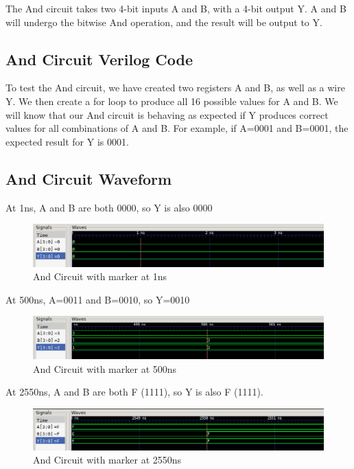 \documentclass[12pt]{article}
\begin{document}
The And circuit takes two 4-bit inputs A and B, with a 4-bit output Y. A and B will undergo the bitwise And operation, and the result will be output to Y.

\subsection{And Circuit Verilog Code} 
 

To test the And circuit, we have created two registers A and B, as well as a wire Y. We then create a for loop to produce all 16 possible values for A and B. We will know that our And circuit is behaving as expected if Y produces correct values for all combinations of A and B. For example, if A=0001 and B=0001, the expected result for Y is 0001. 
 

\subsection{And Circuit Waveform} 

At 1ns, A and B are both 0000, so Y is also 0000
\begin{figure}[H]
 \centering
 \includegraphics[width = 1.0\textwidth]{And/and_wave.png}
 \caption{And Circuit with marker at 1ns}
 \label{fig:enter-label} 
\end{figure} 

At 500ns, A=0011 and B=0010, so Y=0010
 \begin{figure}[H]
 \centering 
\includegraphics[width = 1.0\textwidth]{And/and_wave1.png}
 \caption{And Circuit with marker at 500ns}
 \label{fig:enter-label}
 \end{figure}

At 2550ns, A and B are both F (1111), so Y is also F (1111).
 \begin{figure}[H]
 \centering 
\includegraphics[width = 1.0\textwidth]{And/and_wave2.png}
 \caption{And Circuit with marker at 2550ns}
 \label{fig:enter-label}
 \end{figure}
\end{document}
